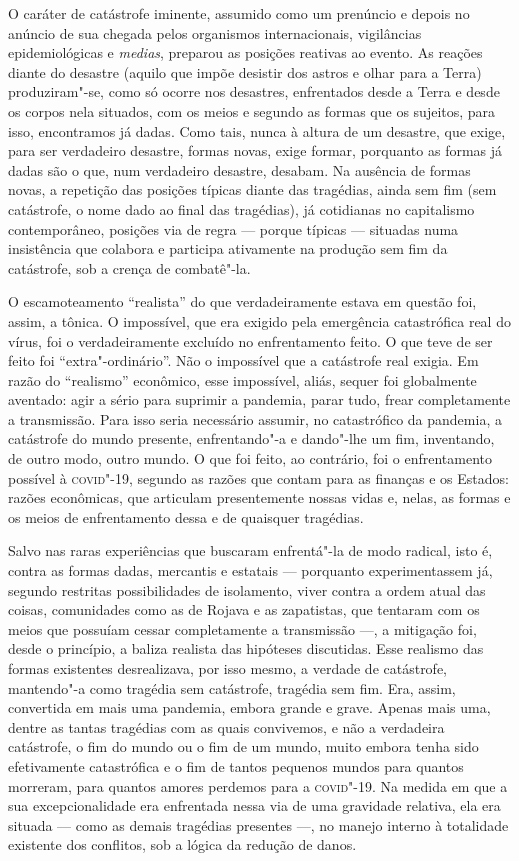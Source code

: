 O caráter de catástrofe iminente, assumido como um prenúncio e depois no
anúncio de sua chegada pelos organismos internacionais, vigilâncias
epidemiológicas e \emph{medias}, preparou as posições reativas ao
evento. As reações diante do desastre (aquilo que impõe desistir dos
astros e olhar para a Terra) produziram"-se, como só ocorre nos
desastres, enfrentados desde a Terra e desde os corpos nela situados,
com os meios e segundo as formas que os sujeitos, para isso, encontramos
já dadas. Como tais, nunca à altura de um desastre, que exige, para ser
verdadeiro desastre, formas novas, exige formar, porquanto as formas já
dadas são o que, num verdadeiro desastre, desabam. Na ausência de formas
novas, a repetição das posições típicas diante das tragédias, ainda sem
fim (sem catástrofe, o nome dado ao final das tragédias), já cotidianas
no capitalismo contemporâneo, posições via de regra --- porque típicas
--- situadas numa insistência que colabora e participa ativamente na
produção sem fim da catástrofe, sob a crença de combatê"-la.

O escamoteamento ``realista'' do que verdadeiramente estava em questão
foi, assim, a tônica. O impossível, que era exigido pela emergência
catastrófica real do vírus, foi o verdadeiramente excluído no
enfrentamento feito. O que teve de ser feito foi ``extra"-ordinário''.
Não o impossível que a catástrofe real exigia. Em razão do ``realismo''
econômico, esse impossível, aliás, sequer foi globalmente aventado: agir
a sério para suprimir a pandemia, parar tudo, frear completamente a
transmissão. Para isso seria necessário assumir, no catastrófico da
pandemia, a catástrofe do mundo presente, enfrentando"-a e dando"-lhe um
fim, inventando, de outro modo, outro mundo. O que foi feito, ao
contrário, foi o enfrentamento possível à \textsc{covid}"-19, segundo as razões
que contam para as finanças e os Estados: razões econômicas, que
articulam presentemente nossas vidas e, nelas, as formas e os meios de
enfrentamento dessa e de quaisquer tragédias.

Salvo nas raras experiências que buscaram enfrentá"-la de modo radical,
isto é, contra as formas dadas, mercantis e estatais --- porquanto
experimentassem já, segundo restritas possibilidades de isolamento,
viver contra a ordem atual das coisas, comunidades como as de Rojava e
as zapatistas, que tentaram com os meios que possuíam cessar
completamente a transmissão ---, a mitigação foi, desde o princípio, a
baliza realista das hipóteses discutidas. Esse realismo das formas
existentes desrealizava, por isso mesmo, a verdade de catástrofe,
mantendo"-a como tragédia sem catástrofe, tragédia sem fim. Era, assim,
convertida em mais uma pandemia, embora grande e grave. Apenas mais uma,
dentre as tantas tragédias com as quais convivemos, e não a verdadeira
catástrofe, o fim do mundo ou o fim de um mundo, muito embora tenha sido
efetivamente catastrófica e o fim de tantos pequenos mundos para quantos
morreram, para quantos amores perdemos para a \textsc{covid}"-19. Na medida em que
a sua excepcionalidade era enfrentada nessa via de uma gravidade
relativa, ela era situada --- como as demais tragédias presentes ---, no
manejo interno à totalidade existente dos conflitos, sob a lógica da
redução de danos.

